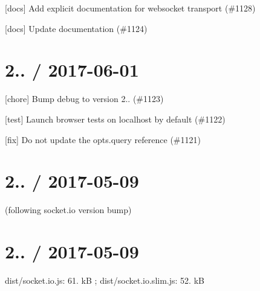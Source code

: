 
\begin{DoxyItemize}
\item \mbox{[}docs\mbox{]} Add explicit documentation for websocket transport (\#1128)
\item \mbox{[}docs\mbox{]} Update documentation (\#1124)
\end{DoxyItemize}

\section*{2.. / 2017-\/06-\/01 }


\begin{DoxyItemize}
\item \mbox{[}chore\mbox{]} Bump debug to version 2.. (\#1123)
\item \mbox{[}test\mbox{]} Launch browser tests on localhost by default (\#1122)
\item \mbox{[}fix\mbox{]} Do not update the opts.\+query reference (\#1121)
\end{DoxyItemize}

\section*{2.. / 2017-\/05-\/09 }

(following socket.\+io version bump)

\section*{2.. / 2017-\/05-\/09 }

{\ttfamily dist/socket.\+io.\+js}\+: 61. kB ; {\ttfamily dist/socket.\+io.\+slim.\+js}\+: 52. kB


